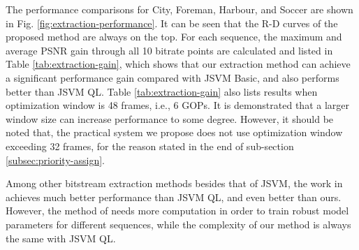 \documentclass[journal]{IEEEtran}
\begin{document}
The performance comparisons for City, Foreman, Harbour, and Soccer are shown in Fig. \ref{fig:extraction-performance}. It can be seen that the R-D curves of the proposed method are always on the top. For each sequence, the maximum and average PSNR gain through all 10 bitrate points are calculated and listed in Table \ref{tab:extraction-gain}, which shows that our extraction method can achieve a significant performance gain compared with JSVM Basic, and also performs better than JSVM QL. Table \ref{tab:extraction-gain} also lists results when optimization window is 48 frames, i.e., 6 GOPs. It is demonstrated that a larger window size can increase performance to some degree. However, it should be noted that, the practical system we propose does not use optimization window exceeding 32 frames, for the reason stated in the end of sub-section \ref{subsec:priority-assign}.

Among other bitstream extraction methods besides that of JSVM, the work in \cite{Maani09} achieves much better performance than JSVM QL, and even better than ours. However, the method of \cite{Maani09} needs more computation in order to train robust model parameters for different sequences, while the complexity of our method is always the same with JSVM QL.
\end{document}
